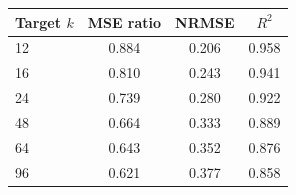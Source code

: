 \begin{tabular}{lccc}
\toprule
Target $k$ & MSE ratio & NRMSE & $R^2$ \\
\midrule
12 & 0.884 & 0.206 & 0.958 \\
16 & 0.810 & 0.243 & 0.941 \\
24 & 0.739 & 0.280 & 0.922 \\
48 & 0.664 & 0.333 & 0.889 \\
64 & 0.643 & 0.352 & 0.876 \\
96 & 0.621 & 0.377 & 0.858 \\
\bottomrule
\end{tabular}
